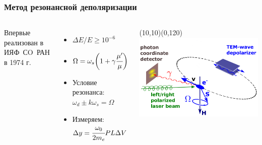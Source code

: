 \documentclass[14pt]{beamer}
\begin{document}
\begin{frame}
\frametitle{Метод резонансной деполяризации}
	\vspace{30pt}
	\begin{columns}
		\begin{minipage}[t][1\textheight]{\linewidth}
				\small{\flushleft	Впервые реализован в ИЯФ~СO~РАН в 1974 г. 
				\begin{itemize}
					\item $\Delta E/E \geqslant 10^{-6}$
					\item $\Omega = \omega_s \biggl(1+ \gamma \cfrac{\mu'}{\mu}\biggr)$
					\item Условие резонанса: $\omega_d \pm k \omega_s = \Omega$
					\item Измеряем: $\Delta y = \cfrac{\omega_0}{2m_e}PL\Delta V$
				\end{itemize}}
		\end{minipage}%
		\begin{minipage}[t][1\textheight]{\linewidth}
			\begin{picture}(10,10)(0,120)
				\includegraphics[width=1\linewidth]{mrd-lsrp.png}
			\end{picture}
		\end{minipage}%
	\end{columns}
	\begin{center}
		
	\end{center}
\end{frame}
\end{document}
